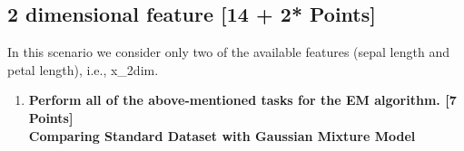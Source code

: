 \documentclass[a4paper]{article}
\begin{document}
\subsection{2 dimensional feature [14 + 2* Points]}
In this scenario we consider only two of the available features (sepal length and petal length), i.e., x\_2dim.
\begin{enumerate}

\item \textbf{Perform all of the above-mentioned tasks for the EM algorithm. [7 Points]} \\

{\large \textbf{Comparing Standard Dataset with Gaussian Mixture Model}} \\

  

\end{enumerate}
\end{document}
